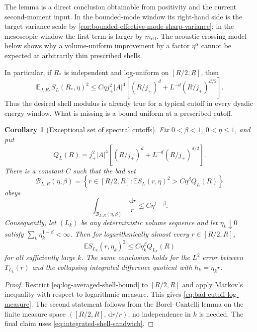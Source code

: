 \documentclass[11pt]{article}
\newtheorem{corollary}[theorem]{Corollary}
\theoremstyle{definition}
\theoremstyle{remark}
\newcommand{\E}{\mathbb E}
\newcommand{\abs}[1]{\left\lvert #1\right\rvert}
\newcommand{\dd}{\,\mathrm d}
\begin{document}
The lemma is a direct conclusion obtainable from positivity and the
current second-moment input.  In the bounded-mode window its right-hand
side is the target variance scale by
\cref{cor:bounded-effective-mode-sharp-variance}; in the mesoscopic window the
first term is larger by $m_{\mathrm{eff}}$.  The acoustic crossing model below
shows why a volume-uniform improvement by a factor $\eta^\alpha$ cannot be
expected at arbitrarily thin prescribed shells.

In particular, if $R_*$ is independent and log-uniform on $[R/2,R]$, then
\begin{equation}
 \E_{J,R_*}S_L(R_*,\eta)^2
 \le C\eta j_+^2\abs A^4\left[
 (R/j_+)^d+L^{-d}(R/j_+)^{d/2}
 \right].
 \label{eq:log-uniform-random-center-shell}
\end{equation}
Thus the desired shell modulus is already true for a typical cutoff in every
dyadic energy window.  What is missing is a bound uniform at a prescribed
cutoff.


\begin{corollary}[Exceptional set of spectral cutoffs]
\label{cor:exceptional-cutoff-set}
Fix $0<\beta<1$, $0<\eta\le1$, and put
\begin{equation}
 Q_L(R)=j_+^2\abs A^4\left[
 (R/j_+)^d+L^{-d}(R/j_+)^{d/2}
 \right].
 \label{eq:dyadic-shell-scale}
\end{equation}
There is a constant $C$ such that the bad set
\begin{equation}
 \mathcal B_{L,R}(\eta,\beta)
 =\left\{r\in[R/2,R]:
 \E S_L(r,\eta)^2>C\eta^\beta Q_L(R)\right\}
 \label{eq:bad-cutoff-set}
\end{equation}
obeys
\begin{equation}
 \boxed{
 \int_{\mathcal B_{L,R}(\eta,\beta)}\frac{\dd r}{r}
 \le C\eta^{1-\beta}.}
 \label{eq:bad-cutoff-log-measure}
\end{equation}
Consequently, let $(L_k)$ be any deterministic volume sequence and let
$\eta_k\downarrow0$ satisfy
$\sum_k\eta_k^{1-\beta}<\infty$.  Then for logarithmically almost every
$r\in[R/2,R]$,
\begin{equation}
 \E S_{L_k}(r,\eta_k)^2
 \le C\eta_k^\beta Q_{L_k}(R)
 \label{eq:almost-every-cutoff-shell}
\end{equation}
for all sufficiently large $k$.  The same conclusion holds for the
$L^2$ error between $T_{L_k}(r)$ and the collapsing integrated difference
quotient with $h_k=\eta_kr$.
\end{corollary}

\begin{proof}
Restrict \eqref{eq:log-averaged-shell-bound} to $[R/2,R]$ and apply Markov's
inequality with respect to logarithmic measure.  This gives
\eqref{eq:bad-cutoff-log-measure}.  The second statement follows from the
Borel--Cantelli lemma on the finite measure space
$([R/2,R],\dd r/r)$; no independence in $k$ is needed.  The final claim uses
\eqref{eq:integrated-shell-sandwich}.
\end{proof}
\end{document}
